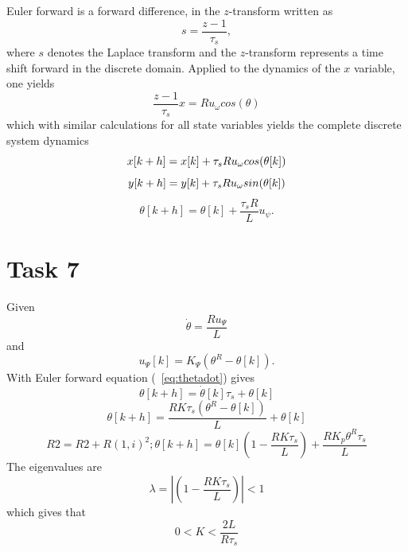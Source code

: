 \documentclass[a4paper,12pt,oneside,onecolumn]{article} %
\begin{document}
Euler forward is a forward difference, in the $z$-transform written as
\begin{equation}
s = \frac{z-1}{\tau_s},
\end{equation}
where $s$ denotes the Laplace transform and the $z$-transform represents a time shift forward in the discrete domain. Applied to the dynamics of the $x$ variable, one yields
\begin{equation}
\frac{z-1}{\tau_s}x=Ru_\omega cos(\theta)
\end{equation}
which with similar calculations for all state variables yields the complete discrete system dynamics
\begin{equation}
\label{eq:xsystem}
x[k+h] = x[k] + \tau_s R u_\omega cos(\theta [k])	\\
\end{equation}
\begin{equation}
\label{eq:ysystem}
y[k+h] = y[k] + \tau_s R u_\omega sin(\theta [k]) \\
\end{equation}
\begin{equation}
\label{thetadynamics}
\theta[k+h] = \theta [k] + \frac{\tau_s R}{L} u_\psi.
\end{equation}


\section*{Task 7}
 	Given
	\begin{equation}
		\dot{\theta} = \frac{Ru_\Psi}{L}
		 \label{eq:thetadot}
	\end{equation}
	and
	\begin{equation}
		u_\Psi{[k]} = K_{\Psi}({\theta}^R  - {\theta}[k]).
	\end{equation}
	With Euler forward equation (~\ref{eq:thetadot}) gives
	\begin{equation}
		\theta[k+h] = \dot{\theta}[k]\tau_s + \theta[k]
	\end{equation}
	\begin{equation}
		\theta[k+h] = \frac{RK\tau_s({\theta}^R  - {\theta}[k])}{L} + \theta[k]
	\end{equation}
	\begin{equation}
R2 = R2 + R(1,i)^2;		\theta[k+h] =\theta[k](1-\frac{RK\tau_s}{L}) + \frac{RK_p\theta^R\tau_s}{L}
	\end{equation}
The eigenvalues are
	\begin{equation}
		\lambda = \left|{(1-\frac{RK\tau_s}{L})}\right| < 1
	\end{equation}
	which gives that 
	\begin{equation}
		0 < K < \frac{2L}{R\tau_s}
	\end{equation}
\end{document}
